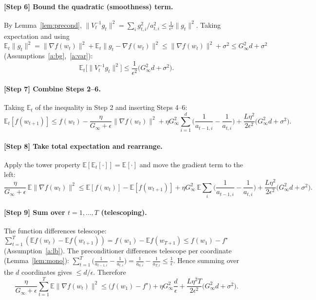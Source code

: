 \documentclass[11pt]{article}
\begin{document}
\paragraph{[Step 6] Bound the quadratic (smoothness) term.}
By Lemma~\ref{lem:precond}, $\|V_t^{-1}g_t\|^2
=\sum_i g_{t,i}^2/a_{t,i}^2 \le \frac{1}{\epsilon^2}\|g_t\|^2$. Taking
expectation and using
$\mathbb{E}_t\|g_t\|^2 = \|\nabla f(w_t)\|^2 + \mathbb{E}_t\|g_t-\nabla f(w_t)\|^2
\le \|\nabla f(w_t)\|^2 + \sigma^2 \le G_\infty^2 d + \sigma^2$
(Assumptions~\ref{a:bg},~\ref{a:var}):
\[
\mathbb{E}_t\big[\|V_t^{-1}g_t\|^2\big]
\le \frac{1}{\epsilon^2}\big(G_\infty^2 d + \sigma^2\big).
\]

\paragraph{[Step 7] Combine Steps 2--6.}
Taking $\mathbb{E}_t$ of the inequality in Step 2 and inserting Steps 4--6:
\[
\mathbb{E}_t[f(w_{t+1})]
\le f(w_t)
- \frac{\eta}{G_\infty+\epsilon}\|\nabla f(w_t)\|^2
+ \eta G_\infty^2 \sum_{i=1}^d\Big(\frac{1}{a_{t-1,i}}-\frac{1}{a_{t,i}}\Big)
+ \frac{L\eta^2}{2\epsilon^2}\big(G_\infty^2 d + \sigma^2\big).
\]

\paragraph{[Step 8] Take total expectation and rearrange.}
Apply the tower property $\mathbb{E}[\mathbb{E}_t[\cdot]]=\mathbb{E}[\cdot]$ and
move the gradient term to the left:
\[
\frac{\eta}{G_\infty+\epsilon}\,\mathbb{E}\|\nabla f(w_t)\|^2
\le \mathbb{E}[f(w_t)] - \mathbb{E}[f(w_{t+1})]
+ \eta G_\infty^2\, \mathbb{E}\!\sum_{i}\Big(\frac{1}{a_{t-1,i}}-\frac{1}{a_{t,i}}\Big)
+ \frac{L\eta^2}{2\epsilon^2}\big(G_\infty^2 d + \sigma^2\big).
\]

\paragraph{[Step 9] Sum over $t=1,\dots,T$ (telescoping).}
The function differences telescope:
$\sum_{t=1}^T(\mathbb{E}f(w_t)-\mathbb{E}f(w_{t+1}))
= f(w_1)-\mathbb{E}f(w_{T+1}) \le f(w_1)-f^\star$
(Assumption~\ref{a:lb}). The preconditioner differences telescope per
coordinate (Lemma~\ref{lem:mono}):
$\sum_{t=1}^T\big(\frac{1}{a_{t-1,i}}-\frac{1}{a_{t,i}}\big)
=\frac{1}{a_{0,i}}-\frac{1}{a_{T,i}}\le \frac{1}{\epsilon}.$
Hence summing over the $d$ coordinates gives $\le d/\epsilon$. Therefore
\[
\frac{\eta}{G_\infty+\epsilon}\sum_{t=1}^T\mathbb{E}\|\nabla f(w_t)\|^2
\le \big(f(w_1)-f^\star\big)
+ \eta G_\infty^2 \frac{d}{\epsilon}
+ \frac{L\eta^2 T}{2\epsilon^2}\big(G_\infty^2 d + \sigma^2\big).
\]
\end{document}
